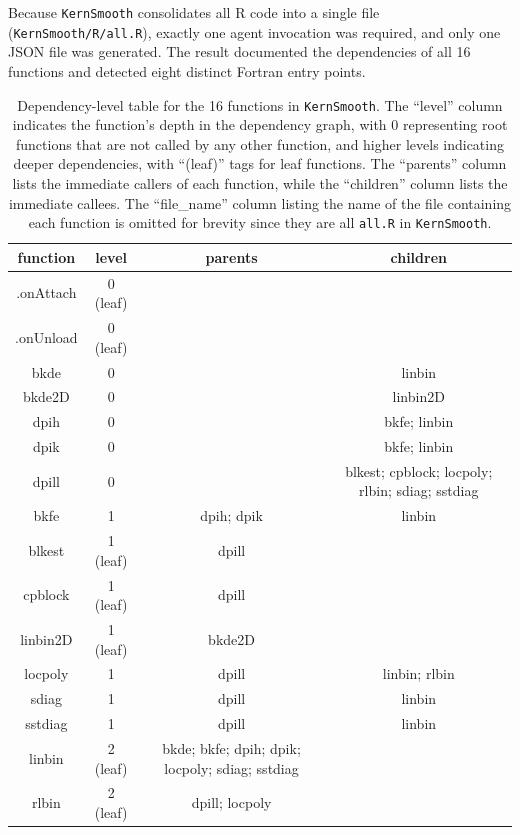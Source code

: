 \documentclass[12pt,a4paper]{article}
\newcommand{\pkg}[1]{\texttt{#1}}
\begin{document}
Because \pkg{KernSmooth} consolidates all R code into a single file (\texttt{KernSmooth/R/all.R}), exactly one agent invocation was required, and only one JSON file was generated. The result documented the dependencies of all 16 functions and detected eight distinct Fortran entry points.

\begin{table}[htbp]
\begin{tabular}{|c|c|c|c|}
\hline
function & level & parents & children \\ \hline
.onAttach & 0 (leaf) &  &  \\ \hline
.onUnload & 0 (leaf) &  &  \\ \hline
bkde & 0 &  & linbin \\ \hline
bkde2D & 0 &  & linbin2D \\ \hline
dpih & 0 &  & bkfe; linbin \\ \hline
dpik & 0 &  & bkfe; linbin \\ \hline
dpill & 0 &  & blkest; cpblock; locpoly; rlbin; sdiag; sstdiag \\ \hline
bkfe & 1 & dpih; dpik & linbin \\ \hline
blkest & 1 (leaf) & dpill &  \\ \hline
cpblock & 1 (leaf) & dpill &  \\ \hline
linbin2D & 1 (leaf) & bkde2D &  \\ \hline
locpoly & 1 & dpill & linbin; rlbin \\ \hline
sdiag & 1 & dpill & linbin \\ \hline
sstdiag & 1 & dpill & linbin \\ \hline
linbin & 2 (leaf) & bkde; bkfe; dpih; dpik; locpoly; sdiag; sstdiag &  \\ \hline
rlbin & 2 (leaf) & dpill; locpoly &  \\ \hline
\end{tabular}
\caption{Dependency-level table for the 16 functions in \pkg{KernSmooth}. The ``level'' column indicates the function's depth in the dependency graph, with 0 representing root functions that are not called by any other function, and higher levels indicating deeper dependencies, with ``(leaf)'' tags for leaf functions. The ``parents'' column lists the immediate callers of each function, while the ``children'' column lists the immediate callees. The ``file\_name'' column listing the name of the file containing each function is omitted for brevity since they are all \texttt{all.R} in \pkg{KernSmooth}.}\label{tab:dag}
\end{table}
\end{document}
